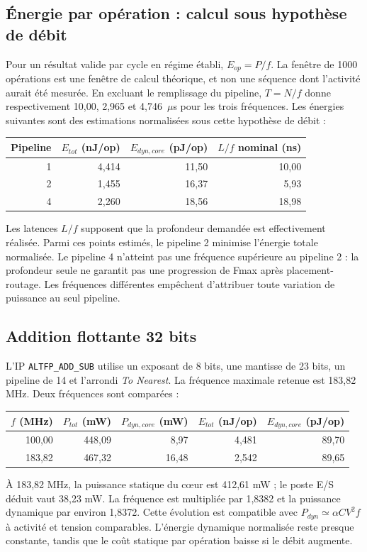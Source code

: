 \documentclass[11pt,a4paper]{article}
\begin{document}
\subsection{Énergie par opération : calcul sous hypothèse de débit}
Pour un résultat valide par cycle en régime établi, $E_{op}=P/f$. La fenêtre de 1000 opérations est une fenêtre de calcul théorique, et non une séquence dont l'activité aurait été mesurée. En excluant le remplissage du pipeline, $T=N/f$ donne respectivement 10,00, 2,965 et 4,746~$\mu$s pour les trois fréquences. Les énergies suivantes sont des estimations normalisées sous cette hypothèse de débit :
\begin{center}
\begin{tabular}{@{}rrrr@{}}
\toprule
Pipeline & $E_{tot}$ (nJ/op) & $E_{dyn,core}$ (pJ/op) & $L/f$ nominal (ns)\\
\midrule
1 & 4,414 & 11,50 & 10,00\\
2 & 1,455 & 16,37 & 5,93\\
4 & 2,260 & 18,56 & 18,98\\
\bottomrule
\end{tabular}
\end{center}
Les latences $L/f$ supposent que la profondeur demandée est effectivement réalisée. Parmi ces points estimés, le pipeline 2 minimise l'énergie totale normalisée. Le pipeline 4 n'atteint pas une fréquence supérieure au pipeline 2 : la profondeur seule ne garantit pas une progression de Fmax après placement-routage. Les fréquences différentes empêchent d'attribuer toute variation de puissance au seul pipeline.

\newpage
\subsection{Addition flottante 32 bits}
L'IP \texttt{ALTFP\_ADD\_SUB} utilise un exposant de 8 bits, une mantisse de 23 bits, un pipeline de 14 et l'arrondi \emph{To Nearest}. La fréquence maximale retenue est 183,82 MHz. Deux fréquences sont comparées :
\begin{center}
\begin{tabular}{@{}rrrrr@{}}
\toprule
$f$ (MHz) & $P_{tot}$ (mW) & $P_{dyn,core}$ (mW) & $E_{tot}$ (nJ/op) & $E_{dyn,core}$ (pJ/op)\\
\midrule
100,00 & 448,09 & 8,97 & 4,481 & 89,70\\
183,82 & 467,32 & 16,48 & 2,542 & 89,65\\
\bottomrule
\end{tabular}
\end{center}
À 183,82 MHz, la puissance statique du c\oe{}ur est 412,61 mW ; le poste E/S déduit vaut 38,23 mW. La fréquence est multipliée par 1,8382 et la puissance dynamique par environ 1,8372. Cette évolution est compatible avec $P_{dyn}\simeq\alpha CV^2f$ à activité et tension comparables. L'énergie dynamique normalisée reste presque constante, tandis que le coût statique par opération baisse si le débit augmente.
\end{document}
